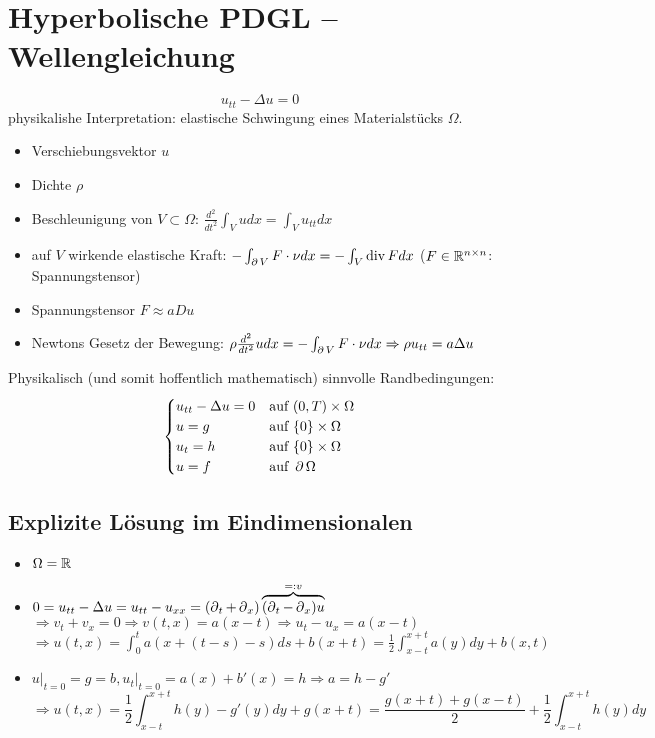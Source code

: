 \section{Hyperbolische PDGL -- Wellengleichung}
\label{sec:para13}
	\[ u_{tt} - \Delta u = 0 \]
	physikalishe Interpretation: elastische Schwingung eines Materialstücks $\Omega$.
	\begin{itemize}
		\item Verschiebungsvektor $u$
		\item Dichte $\rho$
		\item Beschleunigung von $V \subset \Omega$: $\frac{d^2}{dt^2} \int_V udx = \int_V u_{tt} dx$
		\item auf $V$ wirkende elastische Kraft: $-\int_{\operatorname{\partial} V} F \cdot \nu dx = - \int_V \operatorname{div} F dx$ ($F \in \mathbb{R}^{n \times n}$: Spannungstensor)
		\item Spannungstensor $F \approx a Du$
		\item Newtons Gesetz der Bewegung: $\rho \frac{d^2}{dt^2} u dx = - \int_{\operatorname{\partial} V} F \cdot \nu dx \Rightarrow \rho u_{tt} = a \Delta u$
	\end{itemize}
	Physikalisch (und somit hoffentlich mathematisch) sinnvolle Randbedingungen:
	\[ \begin{cases}
	u_{tt} - \Delta u = 0	&	\text{auf } (0,T) \times \Omega	\\
	u = g	&	\text{auf } \{0\} \times \Omega	\\
	u_t = h	&	\text{auf } \{0\} \times \Omega \\
	u = f & \text{auf } \operatorname{\partial} \Omega
	\end{cases} \]
	
\subsection{Explizite Lösung im Eindimensionalen}
	\begin{itemize}
		\item $\Omega = \mathbb{R}$
		\item $0 = u_{tt} - \Delta u = u_{tt} - u_{xx} = (\operatorname{\partial}_t + \operatorname{\partial}_x)\overbrace{(\operatorname{\partial}_t - \operatorname{\partial}_x)u}^{=: v}$ \\
		$\Rightarrow v_t + v_x = 0 \Rightarrow v(t,x) = a(x-t) \Rightarrow u_t - u_x = a(x-t)$\\
		$\Rightarrow u(t,x) = \int_{0}^{t} a(x+(t-s)-s)ds + b(x+t) = \frac{1}{2} \int_{x-t}^{x+t} a(y) dy + b(x,t)$
		\item $u \big|_{t=0} = g = b, u_t \big|_{t=0} = a(x) + b'(x) = h \Rightarrow a = h-g'$ \\
		\[\Rightarrow u(t,x) = \frac{1}{2} \int_{x-t}^{x+t} h(y) - g'(y) dy + g(x+t) = \frac{g(x+t)+g(x-t)}{2} + \frac{1}{2} \int_{x-t}^{x+t} h(y) dy\]
	\end{itemize}
	
